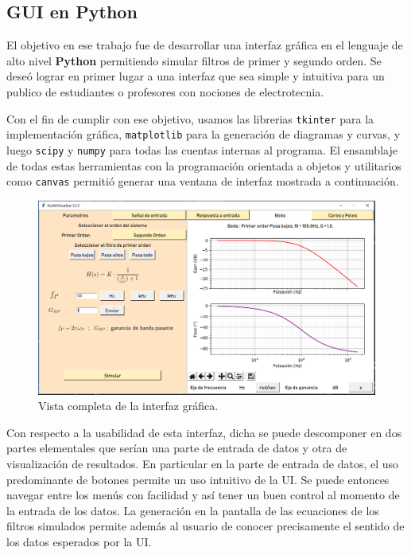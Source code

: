\documentclass[a4paper]{article}
\begin{document}
\subsection*{GUI en Python}

El objetivo en ese trabajo fue de desarrollar una interfaz gráfica en el lenguaje de alto nivel \textbf{Python} permitiendo simular filtros de primer y segundo orden. Se deseó lograr en primer lugar a una interfaz que sea simple y intuitiva para un publico de estudiantes o profesores con nociones de electrotecnia.

\vspace{1em}

Con el fin de cumplir con ese objetivo, usamos las librerias \texttt{tkinter} para la implementación gráfica, \texttt{matplotlib} para la generación de diagramas y curvas, y luego \texttt{scipy} y \texttt{numpy} para todas las cuentas internas al programa. El ensamblaje de todas estas herramientas con la programación orientada a objetos y utilitarios como \texttt{canvas} permitió generar una ventana de interfaz mostrada a continuación.

\begin{figure}[h]
\begin{center}
\includegraphics[scale=0.35]{PantallaUI}
\caption{Vista completa de la interfaz gráfica.}
\end{center}
\end{figure}

Con respecto a la usabilidad de esta interfaz, dicha se puede descomponer en dos partes elementales que serían una parte de entrada de datos y otra de visualización de resultados. En particular en la parte de entrada de datos, el uso predominante de botones permite un uso intuitivo de la UI. Se puede entonces navegar entre los menús con 
facilidad y así tener un buen control al momento de la entrada de los datos. La generación en la pantalla de las ecuaciones de los filtros simulados permite además al usuario de conocer precisamente el sentido de los datos esperados por la UI.
\end{document}
